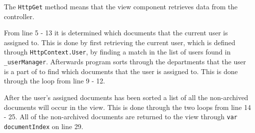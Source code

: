 The \texttt{HttpGet} method means that the view component retrieves data from the controller.

From line 5 - 13 it is determined which documents that the current user is assigned to.
This is done by first retrieving the current user, which is defined through \texttt{HttpContext.User}, by finding a match in the list of users found in \texttt{_userManager}.
Afterwards program sorts through the departments that the user is a part of to find which documents that the user is assigned to.
This is done through the loop from line 9 - 12.

After the user's assigned documents has been sorted a list of all the non-archived documents will occur in the view.
This is done through the two loops from line 14 - 25.
All of the non-archived documents are returned to the view through \texttt{var documentIndex} on line 29.

